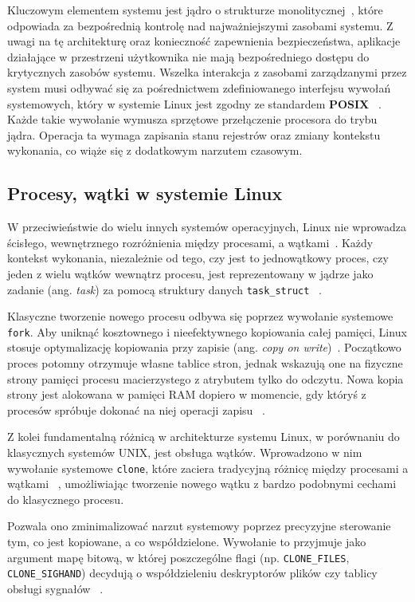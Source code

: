 Kluczowym elementem systemu jest jądro o strukturze monolitycznej~\cite{LinuxKernelDevelopment}, które odpowiada za bezpośrednią kontrolę nad najważniejszymi zasobami systemu.
Z uwagi na tę architekturę oraz konieczność zapewnienia bezpieczeństwa, aplikacje działające w przestrzeni użytkownika nie mają bezpośredniego dostępu do krytycznych zasobów systemu. Wszelka interakcja z zasobami zarządzanymi przez system musi odbywać się za pośrednictwem zdefiniowanego interfejsu wywołań systemowych, który w systemie Linux jest zgodny ze standardem \textbf{POSIX} ~\cite{Tanenbaum}. Każde takie wywołanie wymusza sprzętowe przełączenie procesora do trybu jądra. Operacja ta wymaga zapisania  stanu rejestrów oraz zmiany kontekstu wykonania, co  wiąże się z dodatkowym narzutem czasowym.
\subsection{Procesy, wątki w systemie Linux}

W przeciwieństwie do wielu innych systemów operacyjnych, Linux nie wprowadza ścisłego, wewnętrznego rozróżnienia między procesami, a wątkami~\cite{Tanenbaum}. Każdy kontekst wykonania, niezależnie od tego, czy jest to jednowątkowy proces, czy jeden z wielu wątków wewnątrz procesu, jest reprezentowany w jądrze jako zadanie (ang. \textit{task}) za pomocą struktury danych \texttt{task\_struct} ~\cite{LinuxKernelDevelopment}. 

Klasyczne tworzenie nowego procesu odbywa się poprzez wywołanie systemowe \texttt{fork}. Aby uniknąć kosztownego i nieefektywnego kopiowania całej pamięci, Linux stosuje optymalizację kopiowania przy zapisie (ang. \textit{copy on write})~\cite{LinuxKernelDevelopment}. Początkowo proces potomny otrzymuje własne tablice stron, jednak wskazują one na fizyczne strony pamięci procesu macierzystego z atrybutem tylko do odczytu. Nowa kopia strony jest alokowana w pamięci RAM dopiero w momencie, gdy któryś z procesów spróbuje dokonać na niej operacji zapisu ~\cite{Tanenbaum}.

Z kolei fundamentalną różnicą w architekturze systemu Linux, w porównaniu do klasycznych systemów UNIX, jest obsługa wątków. Wprowadzono w nim wywołanie systemowe \texttt{clone}, które zaciera tradycyjną różnicę między procesami a wątkami ~\cite{Tanenbaum}, umożliwiając tworzenie nowego wątku z bardzo podobnymi cechami do klasycznego procesu. 

Pozwala ono zminimalizować narzut systemowy poprzez precyzyjne sterowanie tym, co jest kopiowane, a co współdzielone. Wywołanie to przyjmuje jako argument mapę bitową, w której poszczególne flagi (np. \texttt{CLONE\_FILES}, \texttt{CLONE\_SIGHAND}) decydują o współdzieleniu deskryptorów plików czy tablicy obsługi sygnałów ~\cite{Tanenbaum}.
